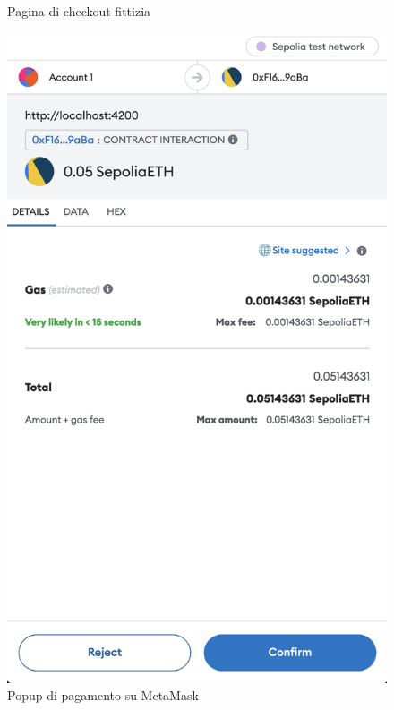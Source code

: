 \begin{figure}[H]
      \caption{Pagina di checkout fittizia}\label{fig:checkout}
    \endminipage\hfill
      \includegraphics[width=\linewidth]{src/img/checkout_metamask.png}
      \caption{Popup di pagamento su MetaMask}\label{fig:checkout_metamask}
    \endminipage\hfill

\end{figure}
